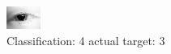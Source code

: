 \begin{figure}[h!]
\begin{center}
\includegraphics[width=0.60\columnwidth]{figures/ID157_class_4_target_3.png}
\end{center}
\caption{ Classification: 4 actual target: 3}
\label{fig:ID157_class_4_target_3}
\end{figure}
